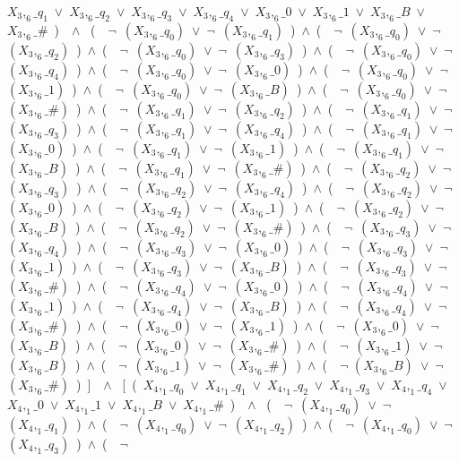 ﻿\documentclass[a4paper,10pt]{article}
\begin{document}
$X_3,_6\_q_1$\ $\vee$\ $X_3,_6\_q_2$\ $\vee$\ $X_3,_6\_q_3$\ $\vee$\ $X_3,_6\_q_4$\ $\vee$\ $X_3,_6\_0$\ $\vee$\ $X_3,_6\_1$\ $\vee$\ $X_3,_6\_B$\ $\vee$\ $X_3,_6\_\#$\ )\ \ $\wedge$ \ (\ \ $\neg$\ $(X_3,_6\_q_0)$\ $\vee$\ $\neg$\ $(X_3,_6\_q_1)$\ )\ $\wedge$\ (\ \ $\neg$\ $(X_3,_6\_q_0)$\ $\vee$\ $\neg$\ $(X_3,_6\_q_2)$\ )\ $\wedge$\ (\ \ $\neg$\ $(X_3,_6\_q_0)$\ $\vee$\ $\neg$\ $(X_3,_6\_q_3)$\ )\ $\wedge$\ (\ \ $\neg$\ $(X_3,_6\_q_0)$\ $\vee$\ $\neg$\ $(X_3,_6\_q_4)$\ )\ $\wedge$\ (\ \ $\neg$\ $(X_3,_6\_q_0)$\ $\vee$\ $\neg$\ $(X_3,_6\_0)$\ )\ $\wedge$\ (\ \ $\neg$\ $(X_3,_6\_q_0)$\ $\vee$\ $\neg$\ $(X_3,_6\_1)$\ )\ $\wedge$\ (\ \ $\neg$\ $(X_3,_6\_q_0)$\ $\vee$\ $\neg$\ $(X_3,_6\_B)$\ )\ $\wedge$\ (\ \ $\neg$\ $(X_3,_6\_q_0)$\ $\vee$\ $\neg$\ $(X_3,_6\_\#)$\ )\ $\wedge$\ (\ \ $\neg$\ $(X_3,_6\_q_1)$\ $\vee$\ $\neg$\ $(X_3,_6\_q_2)$\ )\ $\wedge$\ (\ \ $\neg$\ $(X_3,_6\_q_1)$\ $\vee$\ $\neg$\ $(X_3,_6\_q_3)$\ )\ $\wedge$\ (\ \ $\neg$\ $(X_3,_6\_q_1)$\ $\vee$\ $\neg$\ $(X_3,_6\_q_4)$\ )\ $\wedge$\ (\ \ $\neg$\ $(X_3,_6\_q_1)$\ $\vee$\ $\neg$\ $(X_3,_6\_0)$\ )\ $\wedge$\ (\ \ $\neg$\ $(X_3,_6\_q_1)$\ $\vee$\ $\neg$\ $(X_3,_6\_1)$\ )\ $\wedge$\ (\ \ $\neg$\ $(X_3,_6\_q_1)$\ $\vee$\ $\neg$\ $(X_3,_6\_B)$\ )\ $\wedge$\ (\ \ $\neg$\ $(X_3,_6\_q_1)$\ $\vee$\ $\neg$\ $(X_3,_6\_\#)$\ )\ $\wedge$\ (\ \ $\neg$\ $(X_3,_6\_q_2)$\ $\vee$\ $\neg$\ $(X_3,_6\_q_3)$\ )\ $\wedge$\ (\ \ $\neg$\ $(X_3,_6\_q_2)$\ $\vee$\ $\neg$\ $(X_3,_6\_q_4)$\ )\ $\wedge$\ (\ \ $\neg$\ $(X_3,_6\_q_2)$\ $\vee$\ $\neg$\ $(X_3,_6\_0)$\ )\ $\wedge$\ (\ \ $\neg$\ $(X_3,_6\_q_2)$\ $\vee$\ $\neg$\ $(X_3,_6\_1)$\ )\ $\wedge$\ (\ \ $\neg$\ $(X_3,_6\_q_2)$\ $\vee$\ $\neg$\ $(X_3,_6\_B)$\ )\ $\wedge$\ (\ \ $\neg$\ $(X_3,_6\_q_2)$\ $\vee$\ $\neg$\ $(X_3,_6\_\#)$\ )\ $\wedge$\ (\ \ $\neg$\ $(X_3,_6\_q_3)$\ $\vee$\ $\neg$\ $(X_3,_6\_q_4)$\ )\ $\wedge$\ (\ \ $\neg$\ $(X_3,_6\_q_3)$\ $\vee$\ $\neg$\ $(X_3,_6\_0)$\ )\ $\wedge$\ (\ \ $\neg$\ $(X_3,_6\_q_3)$\ $\vee$\ $\neg$\ $(X_3,_6\_1)$\ )\ $\wedge$\ (\ \ $\neg$\ $(X_3,_6\_q_3)$\ $\vee$\ $\neg$\ $(X_3,_6\_B)$\ )\ $\wedge$\ (\ \ $\neg$\ $(X_3,_6\_q_3)$\ $\vee$\ $\neg$\ $(X_3,_6\_\#)$\ )\ $\wedge$\ (\ \ $\neg$\ $(X_3,_6\_q_4)$\ $\vee$\ $\neg$\ $(X_3,_6\_0)$\ )\ $\wedge$\ (\ \ $\neg$\ $(X_3,_6\_q_4)$\ $\vee$\ $\neg$\ $(X_3,_6\_1)$\ )\ $\wedge$\ (\ \ $\neg$\ $(X_3,_6\_q_4)$\ $\vee$\ $\neg$\ $(X_3,_6\_B)$\ )\ $\wedge$\ (\ \ $\neg$\ $(X_3,_6\_q_4)$\ $\vee$\ $\neg$\ $(X_3,_6\_\#)$\ )\ $\wedge$\ (\ \ $\neg$\ $(X_3,_6\_0)$\ $\vee$\ $\neg$\ $(X_3,_6\_1)$\ )\ $\wedge$\ (\ \ $\neg$\ $(X_3,_6\_0)$\ $\vee$\ $\neg$\ $(X_3,_6\_B)$\ )\ $\wedge$\ (\ \ $\neg$\ $(X_3,_6\_0)$\ $\vee$\ $\neg$\ $(X_3,_6\_\#)$\ )\ $\wedge$\ (\ \ $\neg$\ $(X_3,_6\_1)$\ $\vee$\ $\neg$\ $(X_3,_6\_B)$\ )\ $\wedge$\ (\ \ $\neg$\ $(X_3,_6\_1)$\ $\vee$\ $\neg$\ $(X_3,_6\_\#)$\ )\ $\wedge$\ (\ \ $\neg$ $(X_3,_6\_B)$\ $\vee$\ $\neg$ $(X_3,_6\_\#)$\ )\ ]\ \ $\wedge$ \ [\ (\ $X_4,_1\_q_0$\ $\vee$\ $X_4,_1\_q_1$\ $\vee$\ $X_4,_1\_q_2$\ $\vee$\ $X_4,_1\_q_3$\ $\vee$\ $X_4,_1\_q_4$\ $\vee$\ $X_4,_1\_0$\ $\vee$\ $X_4,_1\_1$\ $\vee$\ $X_4,_1\_B$\ $\vee$\ $X_4,_1\_\#$\ )\ \ $\wedge$ \ (\ \ $\neg$\ $(X_4,_1\_q_0)$\ $\vee$\ $\neg$\ $(X_4,_1\_q_1)$\ )\ $\wedge$\ (\ \ $\neg$\ $(X_4,_1\_q_0)$\ $\vee$\ $\neg$\ $(X_4,_1\_q_2)$\ )\ $\wedge$\ (\ \ $\neg$\ $(X_4,_1\_q_0)$\ $\vee$\ $\neg$\ $(X_4,_1\_q_3)$\ )\ $\wedge$\ (\ \ $\neg$\ 
\end{document}
